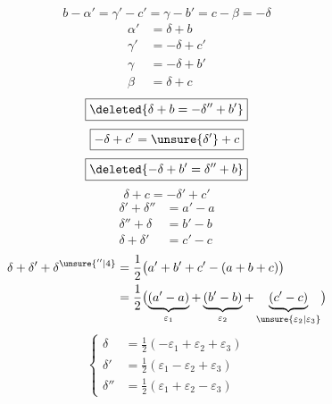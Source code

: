 \[b-\alpha'=\gamma'-c'=\gamma-b'=c-\beta=-\delta\]
\[\begin{aligned}
\alpha'&=\delta+b\\
\gamma'&=-\delta+c'\\
\gamma&=-\delta+b'\\
\beta&=\delta+c
\end{aligned}\]
\[\boxed{\deleted{\delta+b=-\delta''+b'}}\]
\[\boxed{-\delta+c'=\unsure{\delta'}+c}\]
\[\boxed{\deleted{-\delta+b'=\delta''+b}}\]
\[\boxed{\delta+c=-\delta'+c'}\]
\[\begin{aligned}
\delta'+\delta''&=a'-a\\
\delta''+\delta&=b'-b\\
\delta+\delta'&=c'-c
\end{aligned}\]
\[\begin{aligned}
\delta+\delta'+\delta^{\unsure{''|4}}
 &=\frac12\bigl(a'+b'+c'-(a+b+c)\bigr)\\
 &=\frac12\bigl(\underbrace{(a'-a)}_{\varepsilon_1}
 +\underbrace{(b'-b)}_{\varepsilon_2}+\underbrace{(c'-c)}_{\unsure{\varepsilon_2|\varepsilon_3}}\bigr)
\end{aligned}\]
\[\boxed{\left\{\begin{aligned}
\delta&=\frac12(-\varepsilon_1+\varepsilon_2+\varepsilon_3)\\
\delta'&=\frac12(\varepsilon_1-\varepsilon_2+\varepsilon_3)\\
\delta''&=\frac12(\varepsilon_1+\varepsilon_2-\varepsilon_3)
\end{aligned}\right.}\]
